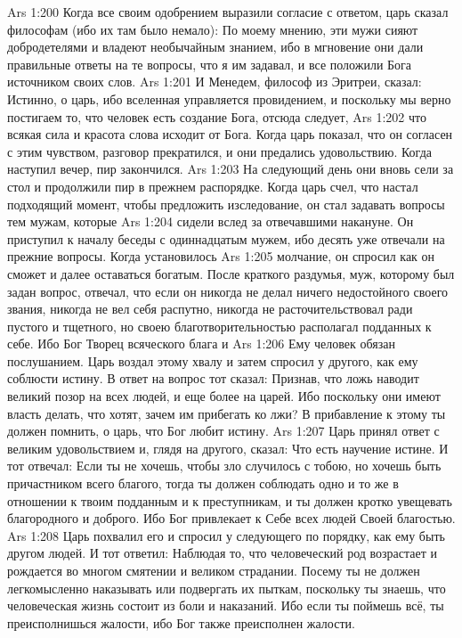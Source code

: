 \vs Ars 1:200
Когда все своим одобрением выразили согласие с ответом, царь сказал философам (ибо их там было немало): По моему мнению, эти мужи сияют добродетелями и владеют необычайным знанием, ибо в мгновение они дали правильные ответы на те вопросы, что я им задавал, и все положили Бога источником своих слов.
\vs Ars 1:201
И Менедем, философ из Эритреи, сказал: Истинно, о царь, ибо вселенная управляется провидением, и поскольку мы верно постигаем то, что человек есть создание Бога, отсюда следует,
\vs Ars 1:202
что всякая сила и красота слова исходит от Бога. Когда царь показал, что он согласен с этим чувством, разговор прекратился, и они предались удовольствию. Когда наступил вечер, пир закончился.
\vs Ars 1:203
На следующий день они вновь сели за стол и продолжили пир в прежнем распорядке. Когда царь счел, что настал подходящий момент, чтобы предложить изследование, он стал задавать вопросы тем мужам, которые
\vs Ars 1:204
сидели вслед за отвечавшими накануне. Он приступил к началу беседы с одиннадцатым мужем, ибо десять уже отвечали на прежние вопросы. Когда установилось
\vs Ars 1:205
молчание, он спросил как он сможет и далее оставаться богатым. После краткого раздумья, муж, которому был задан вопрос, отвечал, что если он никогда не делал ничего недостойного своего звания, никогда не вел себя распутно, никогда не расточительствовал ради пустого и тщетного, но своею благотворительностью располагал подданных к себе. Ибо Бог Творец всяческого блага и
\vs Ars 1:206
Ему человек обязан послушанием.
Царь воздал этому хвалу и затем спросил у другого, как ему соблюсти истину. В ответ на вопрос тот сказал: Признав, что ложь наводит великий позор на всех людей, и еще более на царей. Ибо поскольку они имеют власть делать, что хотят, зачем им прибегать ко лжи? В прибавление к этому ты должен помнить, о царь, что Бог любит истину.
\vs Ars 1:207
Царь принял ответ с великим удовольствием и, глядя на другого, сказал: Что есть научение истине. И тот отвечал: Если ты не хочешь, чтобы зло случилось с тобою, но хочешь быть причастником всего благого, тогда ты должен соблюдать одно и то же в отношении к твоим подданным и к преступникам, и ты должен кротко увещевать благородного и доброго. Ибо Бог привлекает к Себе всех людей Своей благостью.
\vs Ars 1:208
Царь похвалил его и спросил у следующего по порядку, как ему быть другом людей. И тот ответил: Наблюдая то, что человеческий род возрастает и рождается во многом смятении и великом страдании. Посему ты не должен легкомысленно наказывать или подвергать их пыткам, поскольку ты знаешь, что человеческая жизнь состоит из боли и наказаний. Ибо если ты поймешь всё, ты преисполнишься жалости, ибо Бог также преисполнен жалости.
